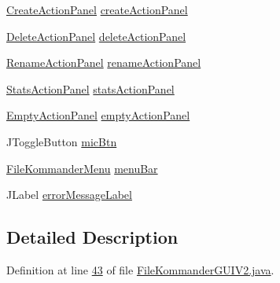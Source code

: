 \begin{DoxyCompactItemize}
\hyperlink{classcom_1_1poly_1_1nlp_1_1filekommander_1_1views_1_1panels_1_1_create_action_panel}{Create\-Action\-Panel} \hyperlink{classcom_1_1poly_1_1nlp_1_1filekommander_1_1views_1_1_file_kommander_g_u_i_v2_a1838b8ff89c4457f8df1209e48f9e474}{create\-Action\-Panel}
\item 
\hyperlink{classcom_1_1poly_1_1nlp_1_1filekommander_1_1views_1_1panels_1_1_delete_action_panel}{Delete\-Action\-Panel} \hyperlink{classcom_1_1poly_1_1nlp_1_1filekommander_1_1views_1_1_file_kommander_g_u_i_v2_ae2f69a147ba867f719ea6a7afbd59974}{delete\-Action\-Panel}
\item 
\hyperlink{classcom_1_1poly_1_1nlp_1_1filekommander_1_1views_1_1panels_1_1_rename_action_panel}{Rename\-Action\-Panel} \hyperlink{classcom_1_1poly_1_1nlp_1_1filekommander_1_1views_1_1_file_kommander_g_u_i_v2_a048a142ae68dfe737d44afc703937678}{rename\-Action\-Panel}
\item 
\hyperlink{classcom_1_1poly_1_1nlp_1_1filekommander_1_1views_1_1panels_1_1_stats_action_panel}{Stats\-Action\-Panel} \hyperlink{classcom_1_1poly_1_1nlp_1_1filekommander_1_1views_1_1_file_kommander_g_u_i_v2_a4a8dcb03bd747de3c01531e30bfb5849}{stats\-Action\-Panel}
\item 
\hyperlink{classcom_1_1poly_1_1nlp_1_1filekommander_1_1views_1_1panels_1_1_empty_action_panel}{Empty\-Action\-Panel} \hyperlink{classcom_1_1poly_1_1nlp_1_1filekommander_1_1views_1_1_file_kommander_g_u_i_v2_a3b3ef122634b10d03fb5120422f5c782}{empty\-Action\-Panel}
\item 
J\-Toggle\-Button \hyperlink{classcom_1_1poly_1_1nlp_1_1filekommander_1_1views_1_1_file_kommander_g_u_i_v2_a302b96f014cd6749805537c5ba00fe7b}{mic\-Btn}
\item 
\hyperlink{classcom_1_1poly_1_1nlp_1_1filekommander_1_1views_1_1_file_kommander_menu}{File\-Kommander\-Menu} \hyperlink{classcom_1_1poly_1_1nlp_1_1filekommander_1_1views_1_1_file_kommander_g_u_i_v2_a0309006087341fa03072dc6b925b5581}{menu\-Bar}
\item 
J\-Label \hyperlink{classcom_1_1poly_1_1nlp_1_1filekommander_1_1views_1_1_file_kommander_g_u_i_v2_a292e43fb091ff0534a6fbf4291e0f58b}{error\-Message\-Label}
\end{DoxyCompactItemize}


\subsection{Detailed Description}


Definition at line \hyperlink{L43}{43} of file \hyperlink{}{File\-Kommander\-G\-U\-I\-V2.\-java}.



